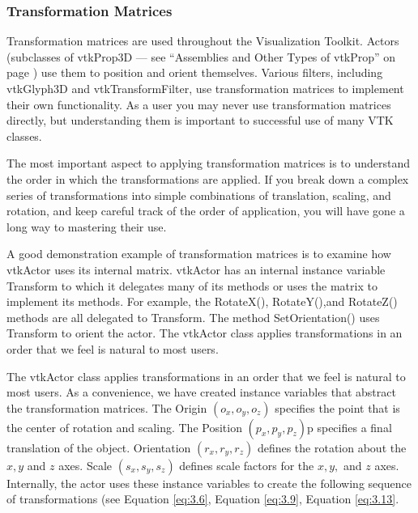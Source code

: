 \subsubsection{Transformation Matrices}
\label{subsubsec:transform_matrices}

Transformation matrices are used throughout the  Visualization Toolkit. Actors (subclasses of vtkProp3D --- see ``Assemblies and Other Types of vtkProp'' on page \pageref{subsubsec:assemblies_vtkprop} ) use them to position and orient themselves. Various filters, including vtkGlyph3D and vtkTransformFilter, use transformation matrices to implement their own functionality. As a user you may never use transformation matrices directly, but understanding them is important to successful use of many VTK classes.

The most important aspect to applying transformation matrices is to understand the order in which the transformations are applied. If you break down a complex series of transformations into simple combinations of translation, scaling, and rotation, and keep careful track of the order of application, you will have gone a long way to mastering their use.

A good demonstration example of transformation matrices is to examine how vtkActor uses its internal matrix. vtkActor has an internal instance variable Transform to which it delegates many of its methods or uses the matrix to implement its methods. For example, the RotateX(), RotateY(),and RotateZ() methods are all delegated to Transform. The method SetOrientation() uses Transform to orient the actor. The vtkActor class applies transformations in an order that we feel is natural to most users.

The vtkActor class applies transformations in an order that we feel is natural to most users. As a convenience, we have created instance variables that abstract the transformation matrices. The Origin $(o_x,o_y,o_z)$ specifies the point that is the center of rotation and scaling. The Position $(p_x, p_y, p_z)$p specifies a final translation of the object. Orientation $(r_x, r_y, r_z)$ defines the rotation about the $x, y$ and $z$ axes. Scale $(s_x, s_y, s_z)$ defines scale factors for the $x, y,$ and $z$ axes. Internally, the actor uses these instance variables to create the following sequence of transformations (see Equation \eqref{eq:3.6}, Equation \eqref{eq:3.9},  Equation \eqref{eq:3.13}.

